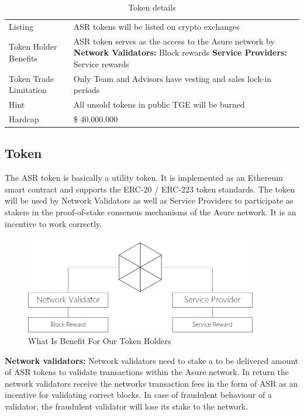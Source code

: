 \begin{table}[H]
\begin{tabular}{lp{}l}
  Listing & ASR tokens will be listed on crypto exchanges \\
  Token Holder Benefits & ASR token serves as the access to the Asure network by\newline
    \textbf{Network Validators:} Block rewards\newline
        \textbf{Service Providers:} Service rewards\\
  Token Trade Limitation & Only Team and Advisors have vesting and sales lock-in periods \\
  Hint & All unsold tokens in public TGE  will be burned \\\hline  
  
  Hardcap & \$ 40.000.000
  
\end{tabular}
\caption{\label{tab:table-name}Token details}
\end{table}

\subsection{Token}

The ASR token is basically a utility token. It is implemented as an Ethereum smart contract and supports the ERC-20 / ERC-223 token standards. The token will be used by Network Validators as well as Service Providers to participate as stakers in the proof-of-stake consensus mechanisms of the Asure network. It is an incentive to work correctly.

\begin{figure}[H]
    \centering
    \includegraphics[width=4.0in]{img/staking.png}
    \caption{What Is Benefit For Our Token Holders}
    \label{fig:asure_architecture}
\end{figure}

\textbf{Network validators:}
Network validators need to stake a to be delivered amount of ASR tokens to validate transactions within the Asure network. In return the network validators receive the networks transaction fees in the form of ASR as an incentive for validating correct blocks. In case of fraudulent behaviour of a validator, the fraudulent validator will lose its stake to the network.

